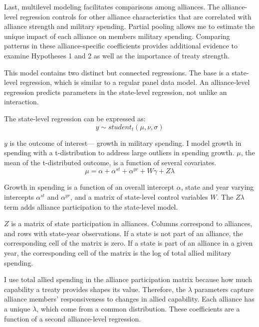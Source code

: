 \documentclass[12pt]{article}
\begin{document}
Last, multilevel modeling facilitates comparisons among alliances. 
The alliance-level regression controls for other alliance characteristics that are correlated with alliance strength and military spending.
Partial pooling allows me to estimate the unique impact of each alliance on members military spending. 
Comparing patterns in these alliance-specific coefficients provides additional evidence to examine Hypotheses 1 and 2 as well as the importance of treaty strength. 


This model contains two distinct but connected regressions. 
The base is a state-level regression, which is similar to a regular panel data model.
An alliance-level regression predicts parameters in the state-level regression, not unlike an interaction. 

The state-level regression can be expressed as:
\begin{equation}
y \sim student_t(\mu, \nu, \sigma)
\end{equation}
 
$y$ is the outcome of interest--- growth in military spending. 
I model growth in spending with a t-distribution to address large outliers in spending growth. 
$\mu$, the mean of the t-distributed outcome, is a function of several covariates. 
\begin{equation}
\mu = \alpha + \alpha^{st} + \alpha^{yr} + W \gamma + Z \lambda
\end{equation}


Growth in spending is a function of an overall intercept $\alpha$, state and year varying intercepts $\alpha^{st}$ and $\alpha^{yr}$, and a matrix of state-level control variables $W$. 
The $Z \lambda$ term adds alliance participation to the state-level model.


$Z$ is a matrix of state participation in alliances. 
Columns correspond to alliances, and rows with state-year observations. 
If a state is not part of an alliance, the corresponding cell of the matrix is zero.
If a state is part of an alliance in a given year, the corresponding cell of the matrix is the log of total allied military spending. 


I use total allied spending in the alliance participation matrix because how much capability a treaty provides shapes its value.   
Therefore, the $\lambda$ parameters capture alliance members' responsiveness to changes in allied capability. 
Each alliance has a unique $\lambda$, which come from a common distribution. 
These coefficients are a function of a second alliance-level regression. 
\end{document}
